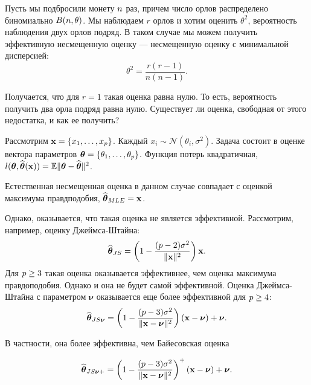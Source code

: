 \begin{example}
Пусть мы подбросили монету $n$ раз, 
причем число орлов распределено биномиально $B(n, \theta)$.
Мы наблюдаем $r$ орлов и хотим оценить $\theta^2$,
вероятность наблюдения двух орлов подряд.
В таком случае мы можем получить эффективную несмещенную оценку --- несмещенную оценку с минимальной дисперсией:
\[
\hat{\theta^2} = \frac{r(r - 1)}{n (n - 1)}.
\]

Получается, что для $r = 1$ такая оценка равна нулю.
То есть, вероятность получить два орла подряд равна нулю.
Существует ли оценка, свободная от этого недостатка, и как ее получить?
\end{example}

\begin{example}
Рассмотрим $\mathbf{x} = \{x_1, \ldots, x_{p}\}$.
Каждый $x_i \sim \mathcal{N}(\theta_i, \sigma^2)$.
Задача состоит в оценке вектора параметров $\boldsymbol{\theta} = \{\theta_1, \ldots, \theta_{p}\}$.
Функция потерь квадратичная, $l(\boldsymbol{\theta}, \widehat{\boldsymbol{\theta}}(\mathbf{x})) = \mathbb{E} \|\boldsymbol{\theta} - \widehat{\boldsymbol{\theta}}\|^2$.

Естественная несмещенная оценка в данном случае совпадает с оценкой максимума правдподобия, $\widehat{\boldsymbol{\theta}}_{MLE} = \mathbf{x}$.

Однако, оказывается, что такая оценка не является эффективной.
Рассмотрим, например, оценку Джеймса-Штайна:
\[
\widehat{\boldsymbol{\theta}}_{JS} = \left(1 - \frac{(p - 2) \sigma^2}{\|\mathbf{x}\|^2} \right) \mathbf{x}.
\]
Для $p \geq 3$ такая оценка оказывается эффективнее, чем оценка максимума правдоподобия.
Однако и она не будет самой эффективной.
Оценка Джеймса-Штайна с параметром $\boldsymbol{\nu}$ оказывается еще более эффективной для $p \geq 4$:
\[
\widehat{\boldsymbol{\theta}}_{JS\boldsymbol{\nu}} = \left(1 - \frac{(p - 3) \sigma^2}{\|\mathbf{x} - \boldsymbol{\nu}\|^2} \right) (\mathbf{x} - \boldsymbol{\nu}) + \boldsymbol{\nu}.
\]

В частности, она более эффективна, чем Байесовская оценка 

\[
\widehat{\boldsymbol{\theta}}_{JS\boldsymbol{\nu}+} = \left(1 - \frac{(p - 3) \sigma^2}{\|\mathbf{x} - \boldsymbol{\nu}\|^2} \right)^+ (\mathbf{x} - \boldsymbol{\nu}) + \boldsymbol{\nu}.
\]
\end{example}


